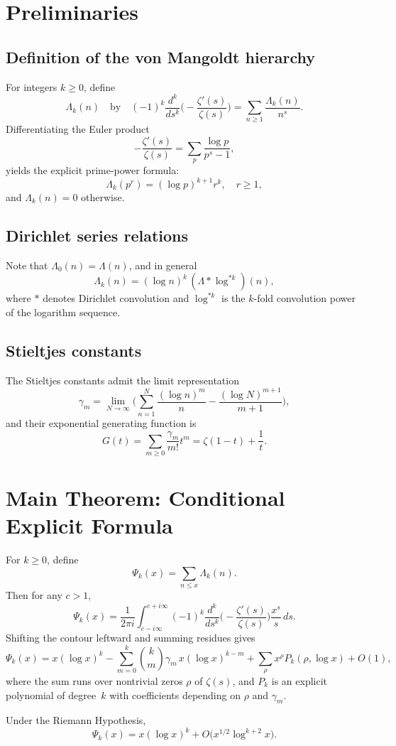 \documentclass[12pt]{amsart}
\begin{document}
\section{Preliminaries}

\subsection{Definition of the von Mangoldt hierarchy}

For integers $k\ge0$, define
\[
\Lambda_k(n)\quad\text{by}\quad
(-1)^k\frac{d^k}{ds^k}\!\Big(-\frac{\zeta'(s)}{\zeta(s)}\Big)
= \sum_{n\ge1}\frac{\Lambda_k(n)}{n^s}.
\]
Differentiating the Euler product
\[
-\frac{\zeta'(s)}{\zeta(s)} = \sum_{p}\frac{\log p}{p^s-1},
\]
yields the explicit prime-power formula:
\[
\boxed{\Lambda_k(p^r) = (\log p)^{k+1}r^k, \quad r\ge1,}
\]
and $\Lambda_k(n)=0$ otherwise.

\subsection{Dirichlet series relations}

Note that $\Lambda_0(n)=\Lambda(n)$, and in general
\[
\Lambda_k(n) = (\log n)^k \, (\Lambda * \log^{*k})(n),
\]
where $*$ denotes Dirichlet convolution and $\log^{*k}$ is the $k$-fold convolution power of the logarithm sequence.

\subsection{Stieltjes constants}

The Stieltjes constants admit the limit representation
\[
\gamma_m = \lim_{N\to\infty}\Bigg(\sum_{n=1}^N\frac{(\log n)^m}{n}
- \frac{(\log N)^{m+1}}{m+1}\Bigg),
\]
and their exponential generating function is
\[
G(t)=\sum_{m\ge0}\frac{\gamma_m}{m!}t^m=\zeta(1-t)+\frac{1}{t}.
\]

\section{Main Theorem: Conditional Explicit Formula}

\begin{theorem}\label{thm:main}
For $k\ge0$, define
\[
\Psi_k(x)=\sum_{n\le x}\Lambda_k(n).
\]
Then for any $c>1$,
\[
\Psi_k(x)=\frac{1}{2\pi i}\int_{c-i\infty}^{c+i\infty}
(-1)^k\frac{d^k}{ds^k}\!\Big(-\frac{\zeta'(s)}{\zeta(s)}\Big)\frac{x^s}{s}\,ds.
\]
Shifting the contour leftward and summing residues gives
\[
\Psi_k(x)
= x(\log x)^k
-\sum_{m=0}^{k}\binom{k}{m}\gamma_m\,x(\log x)^{k-m}
+\sum_{\rho}x^{\rho}P_k(\rho,\log x)
+O(1),
\]
where the sum runs over nontrivial zeros $\rho$ of $\zeta(s)$, and $P_k$ is an explicit polynomial of degree~$k$ with coefficients depending on $\rho$ and $\gamma_m$.

Under the Riemann Hypothesis,
\[
\Psi_k(x) = x(\log x)^k + O\!\big(x^{1/2}\log^{k+2}x\big).
\]
\end{theorem}
\end{document}
